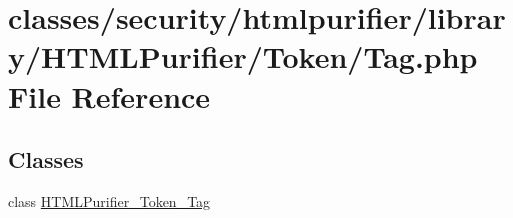 \hypertarget{Tag_8php}{\section{classes/security/htmlpurifier/library/\+H\+T\+M\+L\+Purifier/\+Token/\+Tag.php File Reference}
\label{Tag_8php}
}
\subsection*{Classes}
\begin{DoxyCompactItemize}
\item 
class \hyperlink{classHTMLPurifier__Token__Tag}{H\+T\+M\+L\+Purifier\+\_\+\+Token\+\_\+\+Tag}
\end{DoxyCompactItemize}

